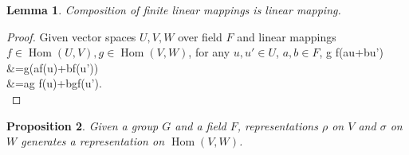 \documentclass[12pt, letterpaper]{article}
\newcommand{\Hom}{\operatorname{Hom}}
\newenvironment{eqlong}{\equation\aligned}{\endaligned\endequation}
\newtheorem{prop}{Proposition}[section]
\newtheorem{lem}[prop]{Lemma}
\theoremstyle{definition}
\theoremstyle{remark}
\theoremstyle{definition}
\theoremstyle{plain}
\numberwithin{equation}{section}
\begin{document}
	\begin{lem}
		Composition of finite linear mappings is linear mapping.
	\end{lem}
	\begin{proof}
		Given vector spaces $U, V, W$ over field $F$ and linear mappings $f\in \Hom(U,V), g\in \Hom(V,W)$,
		for any $u, u' \in U$, $a, b \in F$,
		\begin{eqlong}
			g \circ f(au+bu')
			&=g(af(u)+bf(u'))\\
			&=ag \circ f(u)+bg\circ f(u').\\
		\end{eqlong}
	\end{proof}
	\begin{prop}
		Given a group $G$ and a field $F$, representations $\rho$ on $V$ and $\sigma$ on $W$ generates
		a representation on $\Hom(V,W)$.
	\end{prop}
\end{document}
